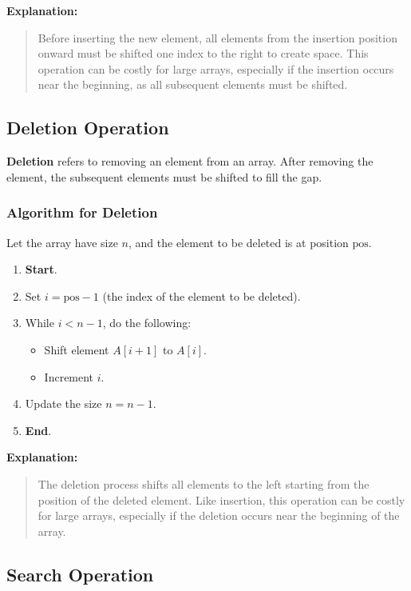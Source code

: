 \documentclass{book}
\begin{document}
\textbf{Explanation:}
\begin{quote}
	Before inserting the new element, all elements from the insertion position onward must be shifted one index to the right to create space. This operation can be costly for large arrays, especially if the insertion occurs near the beginning, as all subsequent elements must be shifted.
\end{quote}

\subsection{Deletion Operation}

\textbf{Deletion} refers to removing an element from an array. After removing the element, the subsequent elements must be shifted to fill the gap.

\subsubsection*{Algorithm for Deletion}

Let the array have size $n$, and the element to be deleted is at position $\text{pos}$.

\begin{enumerate}
	\item \textbf{Start}.
	\item Set $i = \text{pos} - 1$ (the index of the element to be deleted).
	\item While $i < n - 1$, do the following:
	\begin{itemize}
		\item Shift element $A[i + 1]$ to $A[i]$.
		\item Increment $i$.
	\end{itemize}
	\item Update the size $n = n - 1$.
	\item \textbf{End}.
\end{enumerate}

\textbf{Explanation:}
\begin{quote}
	The deletion process shifts all elements to the left starting from the position of the deleted element. Like insertion, this operation can be costly for large arrays, especially if the deletion occurs near the beginning of the array.
\end{quote}

\subsection{Search Operation}
\end{document}
